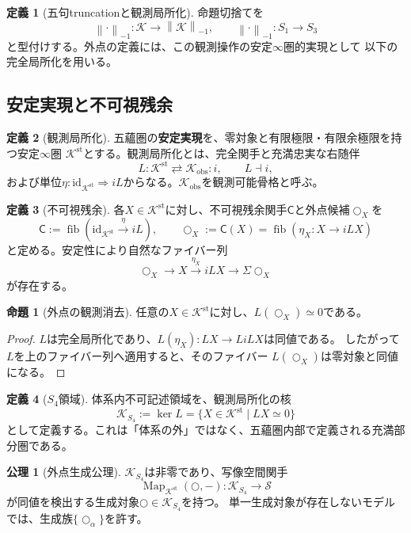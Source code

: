 \documentclass[11pt,a4paper]{ltjsarticle}
\theoremstyle{definition}
\newtheorem{definition}{定義}[section]
\newtheorem{axiom}{公理}[section]
\newtheorem{proposition}{命題}[section]
\newcommand{\id}{\mathrm{id}}
\newcommand{\trunc}[1]{\left\lVert #1\right\rVert_{-1}}
\newcommand{\Kstab}{\mathcal{K}^{\mathrm{st}}}
\newcommand{\Kobs}{\mathcal{K}_{\mathrm{obs}}}
\newcommand{\KSfour}{\mathcal{K}_{S_4}}
\newcommand{\Residual}{\mathsf{C}}
\begin{document}
\begin{definition}[五句truncationと観測局所化]
命題切捨てを
\[
 \trunc{\mathord{\cdot}}:\mathcal{K}\longrightarrow\trunc{\mathcal{K}},
 \qquad \trunc{\mathord{\cdot}}:S_1\longrightarrow S_3
\]
と型付けする。外点の定義には、この観測操作の安定$\infty$圏的実現として
以下の完全局所化を用いる。
\end{definition}

\subsection{安定実現と不可視残余}

\begin{definition}[観測局所化]
五蘊圏の\textbf{安定実現}を、零対象と有限極限・有限余極限を持つ安定$\infty$圏
$\Kstab$とする\cite{LurieHA}。観測局所化とは、完全関手と充満忠実な右随伴
\[
 L:\Kstab\rightleftarrows\Kobs:i,
 \qquad L\dashv i,
\]
および単位$\eta:\id_{\Kstab}\Rightarrow iL$からなる。$\Kobs$を観測可能骨格と呼ぶ。
\end{definition}

\begin{definition}[不可視残余]
各$X\in\Kstab$に対し、不可視残余関手$\Residual$と外点候補$\bigcirc_X$を
\[
 \Residual:=\operatorname{fib}(\id_{\Kstab}\xrightarrow{\eta}iL),
 \qquad
 \bigcirc_X:=\Residual(X)=\operatorname{fib}(\eta_X:X\to iLX)
\]
と定める。安定性により自然なファイバー列
\[
 \bigcirc_X\longrightarrow X\xrightarrow{\eta_X}iLX
 \longrightarrow\Sigma\bigcirc_X
\]
が存在する。
\end{definition}

\begin{proposition}[外点の観測消去]
任意の$X\in\Kstab$に対し、$L(\bigcirc_X)\simeq0$である。
\end{proposition}
\begin{proof}
$L$は完全局所化であり、$L(\eta_X):LX\to L iLX$は同値である。
したがって$L$を上のファイバー列へ適用すると、そのファイバー
$L(\bigcirc_X)$は零対象と同値になる。
\end{proof}

\begin{definition}[$S_4$領域]
体系内不可記述領域を、観測局所化の核
\[
 \KSfour:=\ker L
 =\{X\in\Kstab\mid LX\simeq0\}
\]
として定義する。これは「体系の外」ではなく、五蘊圏内部で定義される充満部分圏である。
\end{definition}

\begin{axiom}[外点生成公理]
$\KSfour$は非零であり、写像空間関手
\[
 \operatorname{Map}_{\Kstab}(\bigcirc,-):\KSfour\longrightarrow\mathcal{S}
\]
が同値を検出する生成対象$\bigcirc\in\KSfour$を持つ。
単一生成対象が存在しないモデルでは、生成族$\{\bigcirc_\alpha\}$を許す。
\end{axiom}
\end{document}
